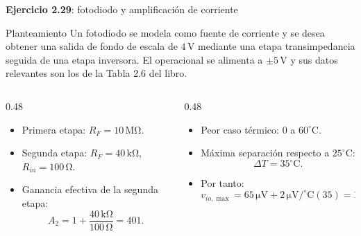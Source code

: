 \documentclass[aspectratio=169,9pt]{beamer}
\newcommand{\exercise}[1]{\textbf{Ejercicio #1}}
\newcommand{\unit}[1]{\,\mathrm{#1}}
\begin{document}
\begin{frame}{\exercise{2.29}: fotodiodo y amplificación de corriente}
  \begin{block}{Planteamiento}
    Un fotodiodo se modela como fuente de corriente y se desea obtener una salida de fondo de escala de \(4\unit{V}\) mediante una etapa transimpedancia seguida de una etapa inversora. El operacional se alimenta a \(\pm 5\unit{V}\) y sus datos relevantes son los de la Tabla 2.6 del libro.
  \end{block}

  \begin{columns}[T,onlytextwidth]
    \begin{column}{0.48\textwidth}
      \begin{itemize}
        \item Primera etapa: \(R_F=10\unit{M\Omega}\).
        \item Segunda etapa: \(R_F=40\unit{k\Omega}\), \(R_{in}=100\unit{\Omega}\).
        \item Ganancia efectiva de la segunda etapa:
        \[
          A_2 = 1+\frac{40\unit{k\Omega}}{100\unit{\Omega}}=401 .
        \]
      \end{itemize}
    \end{column}
    \begin{column}{0.48\textwidth}
      \begin{itemize}
        \item Peor caso térmico: \(0\) a \(60^\circ\mathrm{C}\).
        \item Máxima separación respecto a \(25^\circ\mathrm{C}\):
        \[
          \Delta T=35^\circ\mathrm{C}.
        \]
        \item Por tanto:
        \[
          v_{io,\max}=65\unit{\mu V}+2\unit{\mu V/^\circ C}(35)=135\unit{\mu V}.
        \]
      \end{itemize}
    \end{column}
  \end{columns}
\end{frame}
\end{document}
